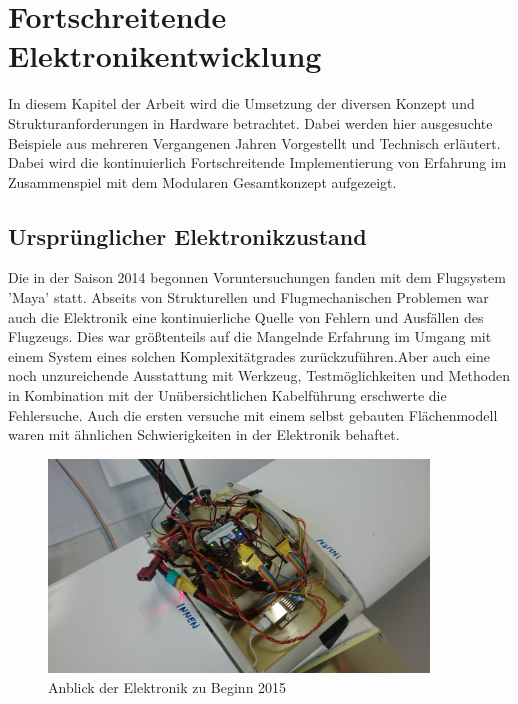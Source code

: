 \chapter{Fortschreitende Elektronikentwicklung}\label{cha:Elektronikentwicklung}

In diesem Kapitel der Arbeit wird die Umsetzung der diversen Konzept und Strukturanforderungen in Hardware betrachtet. Dabei werden hier ausgesuchte Beispiele aus mehreren Vergangenen Jahren Vorgestellt und Technisch erläutert.
Dabei wird die kontinuierlich Fortschreitende Implementierung von Erfahrung im Zusammenspiel mit dem Modularen Gesamtkonzept aufgezeigt.

\section{Ursprünglicher Elektronikzustand}

Die in der Saison 2014 begonnen Voruntersuchungen fanden mit dem Flugsystem 'Maya' statt.
Abseits von Strukturellen und Flugmechanischen Problemen war auch die Elektronik eine kontinuierliche Quelle von Fehlern und Ausfällen des Flugzeugs.
Dies war größtenteils auf die Mangelnde Erfahrung im Umgang mit einem System eines solchen Komplexitätgrades zurückzuführen.Aber auch eine noch unzureichende Ausstattung mit Werkzeug,  Testmöglichkeiten und Methoden in Kombination mit der Unübersichtlichen Kabelführung erschwerte die Fehlersuche.
Auch die ersten versuche mit einem selbst gebauten Flächenmodell waren mit ähnlichen Schwierigkeiten in der Elektronik behaftet.

\begin{figure}[H]
\centering
\includegraphics[width=0.9\textwidth]{bilder/Fotos/Elektronik_Kabelsalat_2015.jpg} 
\caption{Anblick der Elektronik zu Beginn 2015} 
\label{Anblick der Elektronik zu Beginn 2015}
\end{figure}

